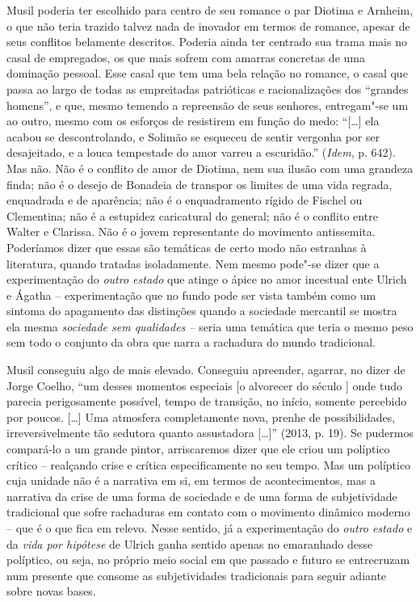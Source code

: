 {Musil poderia ter escolhido para centro de seu romance o par Diotima e
Arnheim, o que não teria trazido talvez nada de inovador em termos de
romance, apesar de seus conflitos belamente descritos. Poderia ainda ter
centrado sua trama mais no casal de empregados, os que mais sofrem com
amarras concretas de uma dominação pessoal. Esse casal que tem uma bela
relação no romance, o casal que passa ao largo de todas as empreitadas
patrióticas e racionalizações dos ``grandes homens'', e que, mesmo
temendo a repreensão de seus senhores, entregam"-se um ao outro, mesmo
com os esforços de resistirem em função do medo: ``[\ldots{}] ela acabou
se descontrolando, e Solimão se esqueceu de sentir vergonha por ser
desajeitado, e a louca tempestade do amor varreu a escuridão.''
(\emph{Idem}, p. 642). Mas não. Não é o conflito de amor de Diotima, nem
sua ilusão com uma grandeza finda; não é o desejo de Bonadeia de
transpor os limites de uma vida regrada, enquadrada e de aparência; não
é o enquadramento rígido de Fischel ou Clementina; não é a estupidez
caricatural do general; não é o conflito entre Walter e Clarissa. Não é
o jovem representante do movimento antissemita. Poderíamos dizer que
essas são temáticas de certo modo não estranhas à literatura, quando
tratadas isoladamente. Nem mesmo pode"-se dizer que a experimentação do
\emph{outro estado} que atinge o ápice no amor incestual ente Ulrich e
Ágatha -- experimentação que no fundo pode ser vista também como um
sintoma do apagamento das distinções quando a sociedade mercantil se
mostra ela mesma \emph{sociedade sem qualidades --} seria uma temática
que teria o mesmo peso sem todo o conjunto da obra que narra a rachadura
do mundo tradicional.

Musil conseguiu algo de mais elevado. Conseguiu apreender, agarrar, no
dizer de Jorge Coelho, ``um desses momentos especiais [o alvorecer do
século ] onde tudo parecia perigosamente possível, tempo de
transição, no início, somente percebido por poucos. [\ldots{}] Uma
atmosfera completamente nova, prenhe de possibilidades,
irreversivelmente tão sedutora quanto assustadora [\ldots{}]'' (2013, p.
19). Se pudermos compará-lo a um grande pintor, arriscaremos dizer que
ele criou um políptico crítico -- realçando crise e crítica
especificamente no seu tempo. Mas um políptico cuja unidade não é a
narrativa em si, em termos de acontecimentos, mas a narrativa da crise
de uma forma de sociedade e de uma forma de subjetividade tradicional
que sofre rachaduras em contato com o movimento dinâmico moderno -- que
é o que fica em relevo. Nesse sentido, já a experimentação do
\emph{outro estado} e da \emph{vida por hipótese} de Ulrich ganha
sentido apenas no emaranhado desse políptico, ou seja, no próprio meio
social em que passado e futuro se entrecruzam num presente que consome
as subjetividades tradicionais para seguir adiante sobre novas bases.

}
